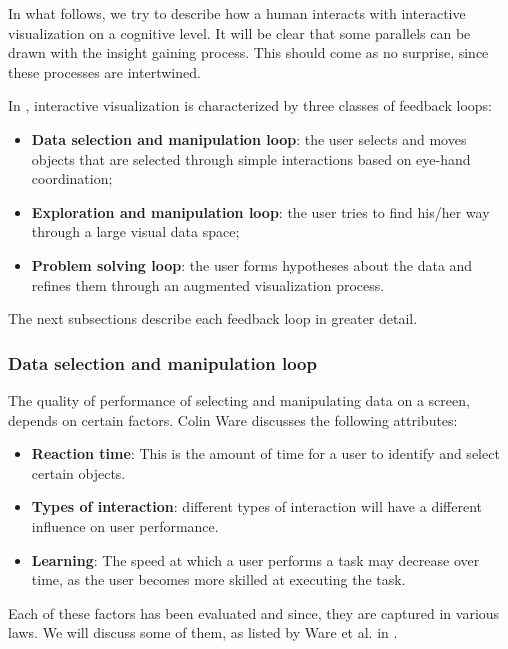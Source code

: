 In what follows, we try to describe how a human interacts with interactive visualization on a cognitive level. It will be clear that some parallels can be drawn with the insight gaining process. This should come as no surprise, since these processes are intertwined\cite{keim:2002, ware:2004, yi:2008}.

In \cite{ware:2004}, interactive visualization is characterized by three classes of feedback loops:

\begin{itemize}
	\item \textbf{Data selection and manipulation loop}: the user selects and moves objects that are selected through simple interactions based on eye-hand coordination;
	\item \textbf{Exploration and manipulation loop}: the user tries to find his/her way through a large visual data space;
	\item \textbf{Problem solving loop}: the user forms hypotheses about the data and refines them through an augmented visualization process.
\end{itemize}

The next subsections describe each feedback loop in greater detail.


\subsubsection{Data selection and manipulation loop}\label{chapter:literature_study:section:user:subsection:interactive:subsubsection:loops1}

The quality of performance of selecting and manipulating data on a screen, depends on certain factors. Colin Ware discusses the following attributes:

\begin{itemize}
	\item \textbf{Reaction time}: This is the amount of time for a user to identify and select certain objects\cite{ware:2004}.
	\item \textbf{Types of interaction}: different types of interaction will have a different influence on user performance.
	\item \textbf{Learning}: The speed at which a user performs a task may decrease over time, as the user becomes more skilled at executing the task.
\end{itemize}

Each of these factors has been evaluated and since, they are captured in various laws. We will discuss some of them, as listed by Ware et al. in \cite{ware:2004}.

